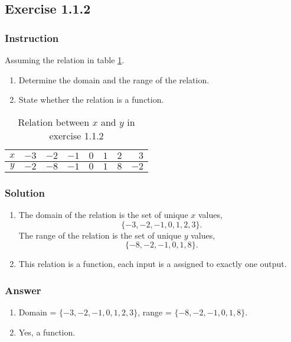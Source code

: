 \documentclass[11pt, letterpaper, oneside]{memoir}
\begin{document}
\subsection*{Exercise 1.1.2}

\subsubsection{Instruction}

Assuming the relation in table \ref{table:exercise-1.1.2}.
\begin{enumerate}[label=(\alph*)]
  \item Determine the domain and the range of the relation.
  \item State whether the relation is a function.
\end{enumerate}

\begin{table}[ht]
  \centering
  \begin{tabular}{ c | r r r r r r r }
    \hline
    $ x $ & $ -3 $ & $ -2 $ & $ -1 $ & $ 0 $ & $ 1 $ & $ 2 $ & $ 3 $ \\
    \hline
    $ y $ & $ -2 $ & $ -8 $ & $ -1 $ & $ 0 $ & $ 1 $ & $ 8 $ & $ -2 $ \\
    \hline
  \end{tabular}
  \caption{Relation between $ x $ and $ y $ in exercise 1.1.2}
  \label{table:exercise-1.1.2}
\end{table}

\subsubsection{Solution}

\begin{enumerate}[label=(\alph*)]
  \item The domain of the relation is the set of unique $ x $ values,
    $$ \phantom{.}
    \{ -3, -2, -1, 0, 1, 2, 3 \}
    .$$
    The range of the relation is the set of unique $ y $ values,
    $$ \phantom{.}
    \{ -8, -2, -1, 0, 1, 8\}
    .$$
  \item This relation is a function, each input is a assigned to exactly one output.
\end{enumerate}

\subsubsection{Answer}

\begin{enumerate}[label=(\alph*)]
  \item Domain = $ \{ -3, -2, -1, 0, 1, 2, 3 \} $, range = $ \{ -8, -2, -1, 0, 1, 8\} $.
  \item Yes, a function.
\end{enumerate}
\end{document}
